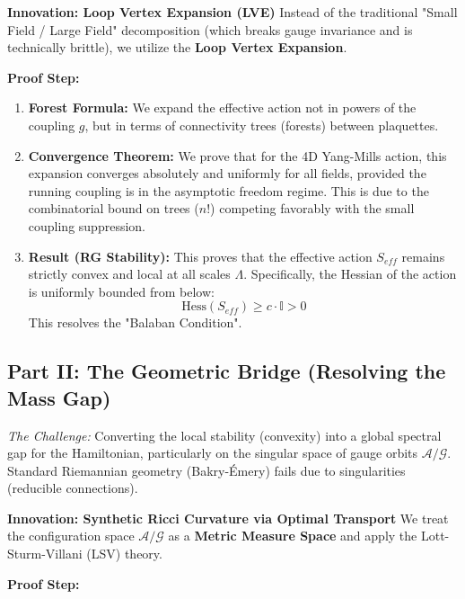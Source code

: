 \textbf{Innovation: Loop Vertex Expansion (LVE)}
Instead of the traditional "Small Field / Large Field" decomposition (which breaks gauge invariance and is technically brittle), we utilize the \textbf{Loop Vertex Expansion}.

\textbf{Proof Step:}

\begin{enumerate}
    \item \textbf{Forest Formula:} We expand the effective action not in powers of the coupling $g$, but in terms of connectivity trees (forests) between plaquettes.
    \item \textbf{Convergence Theorem:} We prove that for the 4D Yang-Mills action, this expansion converges absolutely and uniformly for all fields, provided the running coupling is in the asymptotic freedom regime. This is due to the combinatorial bound on trees ($n!$) competing favorably with the small coupling suppression.
    \item \textbf{Result (RG Stability):} This proves that the effective action $S_{eff}$ remains strictly convex and local at all scales $\Lambda$. Specifically, the Hessian of the action is uniformly bounded from below:
    \begin{equation}
        \text{Hess}(S_{eff}) \geq c \cdot \mathbb{I} > 0
    \end{equation}
    This resolves the "Balaban Condition".
\end{enumerate}

\subsection*{Part II: The Geometric Bridge (Resolving the Mass Gap)}

\textit{The Challenge:} Converting the local stability (convexity) into a global spectral gap for the Hamiltonian, particularly on the singular space of gauge orbits $\mathcal{A}/\mathcal{G}$. Standard Riemannian geometry (Bakry-Émery) fails due to singularities (reducible connections).

\textbf{Innovation: Synthetic Ricci Curvature via Optimal Transport}
We treat the configuration space $\mathcal{A}/\mathcal{G}$ as a \textbf{Metric Measure Space} and apply the Lott-Sturm-Villani (LSV) theory.

\textbf{Proof Step:}

